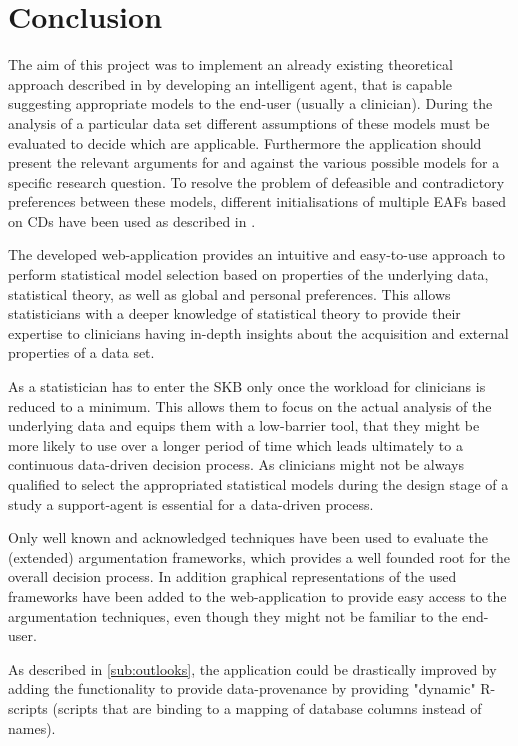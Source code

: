 \section{Conclusion}
\label{sec:conclusion}
The aim of this project was to implement an already existing theoretical approach described in \cite{sassoon2016, sassoon2014, sassoon2016CD} by developing an intelligent agent, that is capable suggesting appropriate models to the end-user (usually a clinician). During the analysis of a particular data set different assumptions of these models must be evaluated to decide which are applicable. Furthermore the application should present the relevant arguments for and against the various possible models  for a specific research question. To resolve the problem of defeasible and contradictory preferences between these models, different initialisations of multiple \glspl{EAF} based on \glspl{CD} have been used as described in \cite{sassoon2016, sassoon2016CD}.

The developed web-application provides an intuitive and easy-to-use approach to perform statistical model selection based on properties of the underlying data, statistical theory, as well as global and personal preferences. This allows statisticians with a deeper knowledge of statistical theory to provide their expertise to clinicians having in-depth insights about the acquisition and external properties of a data set. 

As a statistician has to enter the \gls{SKB} only once the workload for clinicians is reduced to a minimum. This allows them to focus on the actual analysis of the underlying data and equips them with a low-barrier tool, that they might be more likely to use over a longer period of time which leads ultimately to a continuous data-driven decision process. As clinicians might not be always qualified to select the appropriated statistical models during the design stage of a study \cite{sassoon2014} a support-agent is essential for a data-driven process.

Only well known and acknowledged techniques have been used to evaluate the (extended) argumentation frameworks, which provides a well founded root for the overall decision process. In addition graphical representations of the used frameworks have been added to the web-application to provide easy access to the argumentation techniques, even though they might not be familiar to the end-user.

As described in \autoref{sub:outlooks}, the application could be drastically improved by adding the functionality to provide data-provenance by providing "dynamic" \gls{R}-scripts (scripts that are binding to a mapping of database columns instead of names). 

